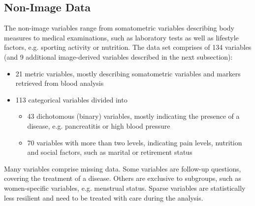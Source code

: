 \documentclass[a4paper,twoside]{style/article}
\newcommand{\com}[1]{\textcolor{orange}{\uline{#1}}}
\begin{document}
\subsection{Non-Image Data}
The non-image variables range from somatometric variables describing body measures to medical examinations, such as laboratory tests as well as lifestyle factors, e.g. sporting activity or nutrition.
The data set comprises of 134 variables (and 9 additional image-derived variables described in the next subsection):
\begin{itemize}
	\item 21 metric variables, mostly describing somatometric variables and markers retrieved from blood analysis
	\item 113 categorical variables divided into
	\begin{itemize}
		\item 43 dichotomous (binary) variables, mostly indicating the presence of a disease, e.g. pancreatitis or high blood pressure
		\item 70 variables with more than two levels, indicating pain levels, nutrition and social factors, such as marital or retirement status
	\end{itemize}
\end{itemize}
Many variables comprise missing data.
Some variables are follow-up questions, covering the treatment of a disease.
Others are exclusive to subgroups, such as women-specific variables, e.g. menstrual status.
Sparse variables are statistically less resilient and need to be treated with care during the analysis.
\end{document}
